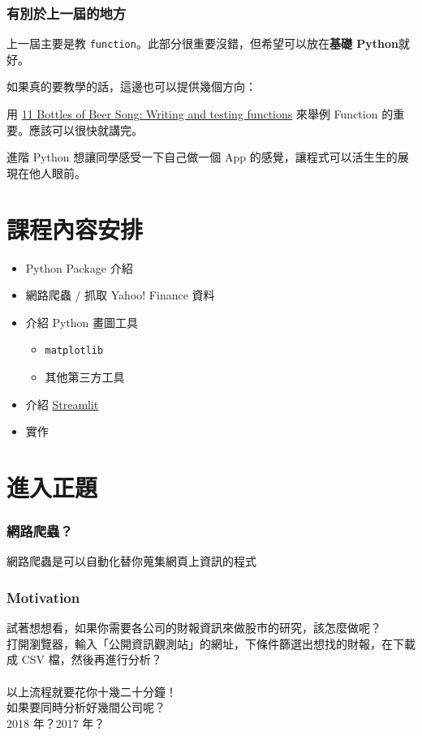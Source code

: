 \documentclass{beamer}
\newcommand{\code}[1]{\texttt{\textcolor{pinky}{#1}}}
\begin{document}
\begin{frame}
  \frametitle{有別於上一屆的地方}
  上一屆主要是教 \code{function}。此部分很重要沒錯，但希望可以放在\textbf{基礎 Python}就好。

  \vspace{5mm} %
  
  如果真的要教學的話，這邊也可以提供幾個方向：
  \begin{examples}
    用 \href{https://livebook.manning.com/book/tiny-python-projects/chapter-11/}{11 Bottles of Beer Song: Writing and testing functions} 來舉例 Function 的重要。應該可以很快就講完。
  \end{examples}

  進階 Python 想讓同學感受一下自己做一個 App 的感覺，讓程式可以活生生的展現在他人眼前。
\end{frame}

\section{課程內容安排}
\begin{frame}
\begin{itemize}
  \item Python Package 介紹
  \item 網路爬蟲 / 抓取 Yahoo! Finance 資料
  \item 介紹 Python 畫圖工具           
  \begin{itemize}
    \item \code{matplotlib}
    \item 其他第三方工具
  \end{itemize}
  \item 介紹 \href{https://streamlit.io}{Streamlit}                     
  \item 實作                               
\end{itemize}
\end{frame}

\section{進入正題}
\begin{frame}
    \frametitle{網路爬蟲？}
網路爬蟲是可以自動化替你蒐集網頁上資訊的程式

\end{frame}

\begin{frame}
    \frametitle{Motivation}

    試著想想看，如果你需要各公司的財報資訊來做股市的研究，該怎麼做呢？\\
    打開瀏覽器，輸入「公開資訊觀測站」的網址，下條件篩選出想找的財報，在下載成 CSV 檔，然後再進行分析？\footnotemark\\
    \quad \\ 
    以上流程就要花你十幾二十分鐘！\\
    如果要同時分析好幾間公司呢？\\
    2018 年？2017 年？
\end{frame}
\end{document}
